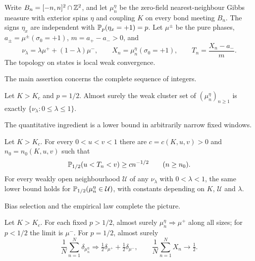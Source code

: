Write $B_n=[-n,n]^2\cap\mathbb Z^2$, and let $\mu_n^\eta$ be the zero-field nearest-neighbour Gibbs measure with exterior spins $\eta$ and coupling $K$ on every bond meeting $B_n$. The signs $\eta_x$ are independent with $\mathbb P_p(\eta_x=+1)=p$. Let $\mu^\pm$ be the pure phases, $a_\pm=\mu^\pm(\sigma_0=+1)$, $m=a_+-a_->0$, and
\[
 \nu_\lambda=\lambda\mu^++(1-\lambda)\mu^-,\qquad
 X_n=\mu_n^\eta(\sigma_0=+1),\qquad
 T_n=\frac{X_n-a_-}{m}.
\]
The topology on states is local weak convergence.

The main assertion concerns the complete sequence of integers.
\begin{maintheorem}\label{thm:cluster}
Let $K>K_c$ and $p=1/2$. Almost surely the weak cluster set of $(\mu_n^\eta)_{n\ge1}$ is exactly $\{\nu_\lambda:0\le\lambda\le1\}$.
\end{maintheorem}

The quantitative ingredient is a lower bound in arbitrarily narrow fixed windows.
\begin{maintheorem}\label{thm:lower}
Let $K>K_c$. For every $0<u<v<1$ there are $c=c(K,u,v)>0$ and $n_0=n_0(K,u,v)$ such that
\[
 \mathbb P_{1/2}(u<T_n<v)\ge c n^{-1/2}\qquad(n\ge n_0).
\]
For every weakly open neighbourhood $\mathcal U$ of any $\nu_\lambda$ with $0<\lambda<1$, the same lower bound holds for $\mathbb P_{1/2}(\mu_n^\eta\in\mathcal U)$, with constants depending on $K$, $\mathcal U$ and $\lambda$.
\end{maintheorem}

Bias selection and the empirical law complete the picture.
\begin{maintheorem}\label{thm:laws}
Let $K>K_c$. For each fixed $p>1/2$, almost surely $\mu_n^\eta\Rightarrow\mu^+$ along all sizes; for $p<1/2$ the limit is $\mu^-$. For $p=1/2$, almost surely
\[
 \frac1N\sum_{n=1}^N\delta_{\mu_n^\eta}
 \Rightarrow\tfrac12\delta_{\mu^+}+\tfrac12\delta_{\mu^-},
 \qquad \frac1N\sum_{n=1}^N X_n\longrightarrow\tfrac12.
\]
\end{maintheorem}


